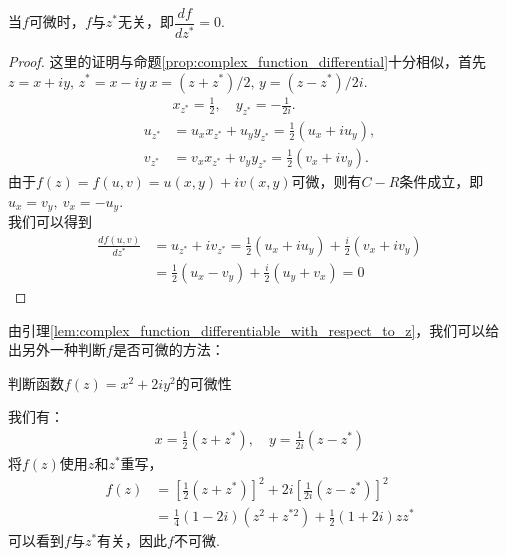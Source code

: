         \begin{lemma}
            \label{lem:complex_function_differentiable_with_respect_to_z}
            当$f$可微时，$f$与$z^*$无关，即$\dfrac{df}{dz^*} = 0$.
        \end{lemma}
        \begin{proof}
            这里的证明与命题\ref{prop:complex_function_differential}十分相似，首先$z=x+iy,\,z^*=x-iy\ x=(z+z^*)/2,\,y=(z-z^*)/2i$.
            \begin{align*}
                &x_{z^*}=\frac{1}{2},\quad y_{z^*}=-\frac{1}{2i}.\\
                u_{z^*}&=u_x x_{z^*} + u_y y_{z^*}=\frac{1}{2}(u_x+iu_y),\\
                v_{z^*}&=v_x x_{z^*} + v_y y_{z^*}=\frac{1}{2}(v_x+iv_y).
            \end{align*}
            由于$f(z)=f(u,v)=u(x,y)+iv(x,y)$可微，则有$C-R$条件成立，即$u_x=v_y,\ v_x=-u_y$.\\
            我们可以得到
            \begin{align*}
                \frac{df(u,v)}{dz^*}&=u_{z^*}+iv_{z^*}=\frac{1}{2}(u_x+iu_y)+\frac{i}{2}(v_x+iv_y)\\
                &=\frac{1}{2}(u_x-v_y)+\frac{i}{2}(u_y+v_x)=0
            \end{align*}

        \end{proof}
        由引理\ref{lem:complex_function_differentiable_with_respect_to_z}，我们可以给出另外一种判断$f$是否可微的方法：
        \begin{example}
            判断函数$f(z) = x^2 +2iy^2$的可微性
        \end{example}
        \begin{solution}
            我们有：
            \begin{align*}
                x = \frac{1}{2}(z + z^*), \quad y = \frac{1}{2i}(z - z^*)
            \end{align*}
            将$f(z)$使用$z$和$z^*$重写，
            \begin{align*}
                f(z) &= [\frac{1}{2}(z + z^*)]^2 + 2i[\frac{1}{2i}(z - z^*)]^2\\
                &= \frac{1}{4}(1 - 2i)(z^2 + z^{*2}) + \frac{1}{2}(1 + 2i)zz^*
            \end{align*}
            可以看到$f$与$z^*$有关，因此$f$不可微.
        \end{solution}

